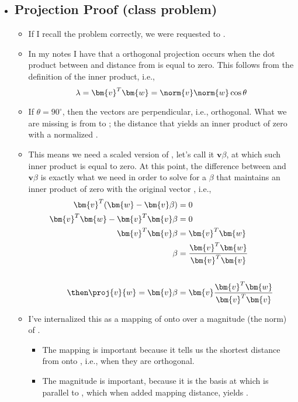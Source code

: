 \begin{itemize}
  \item []

  \subsection{Projection Proof (class problem)}
  \begin{itemize}
    \item If I recall the problem correctly, we were requested to .

    \item In my notes I have that a orthogonal projection occurs when the dot
      product between  and distance  from  is equal to
      zero. This follows from the definition of the inner product, i.e.,
      \[%
      \lambda = \bm{v}^T \bm{w} = \norm{v} \norm{w} \cos \theta
      \]%
    \item If \(\theta = 90^\circ\), then the vectors are perpendicular, i.e.,
      orthogonal. What we are missing is  from  to
      ; the distance that yields an inner product of zero with a
      normalized  .
    \item This means we need a scaled version of , let's call it
      \(\bm{v}\beta\), at which such inner product is equal to zero. At this
      point, the difference between  and \(\bm{v}\beta\) is exactly what
      we need in order to solve for a \(\beta\) that maintains an inner
      product of zero with the original vector , i.e.,
      \begin{align*}
        \bm{v}^T (\bm{w}-\bm{v}\beta) &= 0 \\
        \bm{v}^T\bm{w}-\bm{v}^T \bm{v}\beta &= 0 \\
        \bm{v}^T \bm{v}\beta &= \bm{v}^T\bm{w} \\
        \beta &= \frac{\bm{v}^T\bm{w}}{\bm{v}^T \bm{v}}\\\\
        \then
        \proj{v}{w} = \bm{v}\beta &= \bm{v}\frac{\bm{v}^T\bm{w}}{\bm{v}^T \bm{v}}
      \end{align*}
    \item I've internalized this as a mapping of  onto
       over a magnitude (the norm) of .
      \begin{itemize}
        \item The mapping is important because it tells us the shortest
          distance from  onto , i.e., when they are orthogonal.
        \item The magnitude is important, because it is the basis at which
           is parallel to , which when added mapping distance,
          yields .
      \end{itemize}
  \end{itemize}


\end{itemize}
